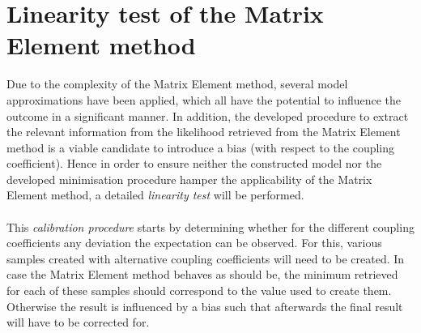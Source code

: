 \section{Linearity test of the Matrix Element method} \label{sec::CalibCurve}

Due to the complexity of the Matrix Element method, several model approximations have been applied, which all have the potential to influence the outcome in a significant manner. 
In addition, the developed procedure to extract the relevant information from the likelihood retrieved from the Matrix Element method is a viable candidate to introduce a bias (with respect to the coupling coefficient).
Hence in order to ensure neither the constructed model nor the developed minimisation procedure hamper the applicability of the Matrix Element method, a detailed \textit{linearity test} will be performed. 
\\
\\
This \textit{calibration procedure} starts by determining whether for the different coupling coefficients any deviation the expectation can be observed. For this, various samples created with alternative coupling coefficients will need to be created. In case the Matrix Element method behaves as should be, the minimum retrieved for each of these samples should correspond to the value used to create them. Otherwise the result is influenced by a bias such that afterwards the final result will have to be corrected for.
\\

